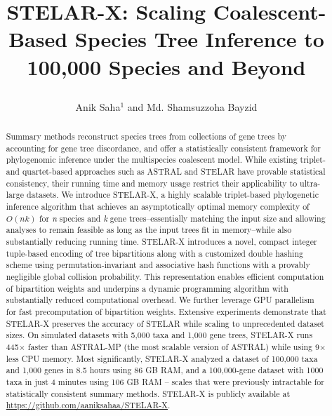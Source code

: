 \documentclass[10pt,a4paper]{article}
\title{STELAR-X: Scaling Coalescent-Based Species Tree Inference to 100,000 Species and Beyond
\author[1,*]{Anik Saha$^{1}$ and Md. Shamsuzzoha Bayzid}
}
\affil[1]{Department of Computer Science and Engineering\protect\\Bangladesh University of Engineering and Technology, Dhaka-1205, Bangladesh}
\affil[*]{Corresponding author: shams\_bayzid@cse.buet.ac.bd}
\date{}
\newcommand{\add}[1]{{\color{blue} #1}}
\newcommand{\add}[1]{{\color{blue} #1}}
\begin{document}
\maketitle


\begin{abstract}


Summary methods reconstruct species trees from collections of gene trees by accounting for gene tree discordance, and offer a statistically consistent framework for phylogenomic inference under the multispecies coalescent model.
While existing triplet- and quartet-based approaches such as ASTRAL and STELAR have provable statistical consistency, their running time and memory usage restrict their applicability to ultra-large datasets. We introduce STELAR-X, a highly scalable triplet-based phylogenetic inference algorithm that achieves an asymptotically optimal memory complexity of $O(nk)$ for \textit{n} species and \textit{k} gene trees--essentially matching the input size and allowing analyses to remain feasible as long as the input trees fit in memory--while also substantially reducing running time. STELAR-X introduces a novel, compact integer tuple-based encoding of tree bipartitions along with a customized double hashing scheme using permutation-invariant and associative hash functions with a provably negligible global collision probability. This representation enables efficient computation of bipartition weights and underpins a dynamic programming algorithm with substantially reduced computational overhead.
We further leverage GPU parallelism for fast precomputation of bipartition weights. Extensive experiments demonstrate that STELAR-X preserves the  accuracy of STELAR while scaling to unprecedented dataset sizes. On simulated datasets with 5,000 taxa and 1,000 gene trees, STELAR-X runs 445$\times$ faster than ASTRAL-MP (the most scalable version of ASTRAL) while using 9$\times$ less CPU memory. Most significantly, STELAR-X analyzed a dataset of 100,000 taxa and 1,000 genes in  8.5 hours using 86 GB RAM, and a 100,000-gene dataset with 1000 taxa in just 4 minutes using 106 GB RAM -- scales that were previously intractable for statistically consistent summary methods. STELAR-X is publicly available at \url{https://github.com/aaniksahaa/STELAR-X}.


\end{abstract}
\end{document}
